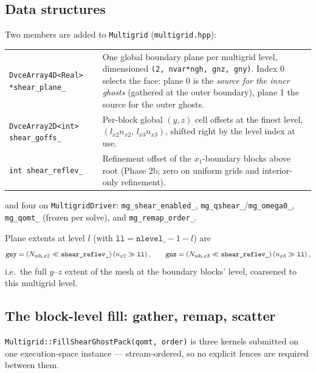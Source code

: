 \documentclass[11pt]{article}
\newcommand{\code}[1]{\texttt{#1}}
\newcommand{\file}[1]{\texttt{\small #1}}
\newcommand{\fn}[1]{\texttt{\small #1}}
\begin{document}
\subsection{Data structures}

Two members are added to \code{Multigrid} (\file{multigrid.hpp}):

\begin{center}
\small
\begin{tabular}{@{}lp{9.4cm}@{}}
\toprule
\code{DvceArray4D<Real> *shear\_plane\_} & One global boundary plane per multigrid
level, dimensioned \code{(2, nvar*ngh, gnz, gny)}. Index 0 selects the face: plane
0 is the \emph{source for the inner ghosts} (gathered at the outer boundary), plane 1
the source for the outer ghosts. \\
\code{DvceArray2D<int> shear\_goffs\_} & Per-block global $(y,z)$ cell offsets at the
finest level, $(l_{x2}n_{x2},\, l_{x3}n_{x3})$, shifted right by the level index at
use. \\
\code{int shear\_reflev\_} & Refinement offset of the $x_1$-boundary blocks above root
(Phase 2b; zero on uniform grids and interior-only refinement). \\
\bottomrule
\end{tabular}
\end{center}

\noindent
and four on \code{MultigridDriver}: \code{mg\_shear\_enabled\_},
\code{mg\_qshear\_}/\code{mg\_omega0\_}, \code{mg\_qomt\_} (frozen per solve), and
\code{mg\_remap\_order\_}.

Plane extents at level $l$ (with $\code{ll} = \code{nlevel\_}-1-l$) are
\begin{equation}
  \code{gny} = \left(N_{{\rm mb},x2} \ll \code{shear\_reflev\_}\right)
               \left(n_{x2} \gg \code{ll}\right), \qquad
  \code{gnz} = \left(N_{{\rm mb},x3} \ll \code{shear\_reflev\_}\right)
               \left(n_{x3} \gg \code{ll}\right),
\end{equation}
i.e.\ the full $y$--$z$ extent of the mesh at the boundary blocks' level, coarsened to
this multigrid level.

\subsection{The block-level fill: gather, remap, scatter}
\label{sec:fillpack}

\fn{Multigrid::FillShearGhostPack(qomt, order)} is three kernels submitted on one
execution-space instance --- stream-ordered, so no explicit fences are required
between them.
\end{document}
